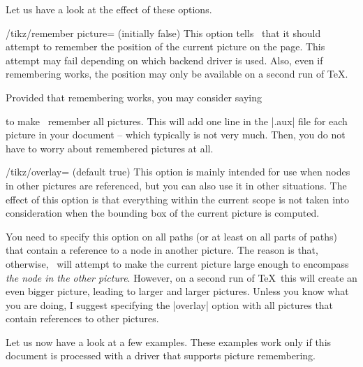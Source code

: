 Let us have a look at the effect of these options.
\begin{key}{/tikz/remember picture= (initially false)}
  This option tells \tikzname\ that it should attempt to remember the
  position of the current picture on the page. This attempt may fail
  depending on which backend driver is used. Also, even if remembering
  works, the position may only be available on a second run of \TeX.

  Provided that remembering works, you may consider saying
\begin{codeexample}
\end{codeexample}
  to make \tikzname\ remember all pictures. This will add one line in
  the |.aux| file for each picture in your document -- which typically
  is not very much. Then, you do not have to worry about remembered
  pictures at all.
\end{key}

\begin{key}{/tikz/overlay= (default true)}
  This option is mainly intended for use when nodes in other pictures
  are referenced, but you can also use it in other situations. The
  effect of this option is that everything within the current scope is
  not taken into consideration when the bounding box of the current
  picture is computed.

  You need to specify this option on all paths (or at least on all
  parts of paths) that contain a reference to a node in another
  picture. The reason is that, otherwise, \tikzname\ will attempt to
  make the current picture large enough to encompass \emph{the node in
    the other picture}. However, on a second run of \TeX\ this will
  create an even bigger picture, leading to larger and larger
  pictures. Unless you know what you are doing, I suggest specifying
  the |overlay| option with all pictures that contain references to
  other pictures.
\end{key}

Let us now have a look at a few examples. These examples work only if
this document is processed with a driver that supports picture
remembering.
\medskip

